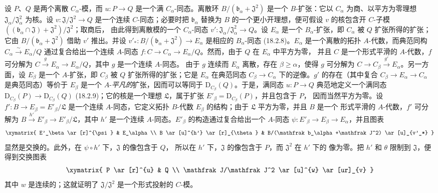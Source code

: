 \begin{env}[19.5.6.1]
\label{0.19.5.6.1-fr}
设 $P$、$Q$ 是两个离散 $C_\alpha$-模，而
$u:P\to Q$ 是一个满 $C_\alpha$-同态。离散环
$B/(\mathfrak b_\alpha+\mathfrak J^2)$ 是一个 $B$-扩张：它以
$C_\alpha$ 为商、以平方为零理想
$\mathfrak J_\alpha/\mathfrak J_\alpha^2$ 为核。设
$v:\mathfrak J/\mathfrak J^2\to Q$ 是一个连续 $C$-同态；必要时把
$\mathfrak b_\alpha$ 替换为 $B$ 的一个更小开理想，便可假设 $v$ 的核包含开
$C$-子模
$((\mathfrak b_\alpha\cap\mathfrak J)+\mathfrak J^2)/\mathfrak J^2$；取商后，
由此得到离散模的一个 $C_\alpha$-同态
$v':\mathfrak J_\alpha/\mathfrak J_\alpha^2\to Q$。设 $E_\alpha$ 是一个
$B_\alpha$-扩张，即 $C_\alpha$ 被 $Q$ 扩张所得的扩张；它由
$B/(\mathfrak b_\alpha+\mathfrak J^2)$ 借助 $v'$ 推出。并设
$v'_*:B/(\mathfrak b_\alpha+\mathfrak J^2)\to E_\alpha$ 是相应的
$B_\alpha$-同态 (18.2.8)。$E_\alpha$ 是一个离散的拓扑 $A$-代数，而典范同构
$C_\alpha\xrightarrow{\sim}E_\alpha/Q$ 通过复合给出一个连续 $A$-同态
$f:C\to C_\alpha\to E_\alpha/Q$。然而，由于 $Q$ 在 $E_\alpha$ 中平方为零，
并且 $C$ 是一个形式平滑的 $A$-代数，$f$ 可分解为
$C\xrightarrow{g}E_\alpha\to E_\alpha/Q$，其中 $g$ 是一个连续 $A$-同态。
由于 $g$ 连续而 $E_\alpha$ 离散，存在 $\beta\geq\alpha$，使得 $g$ 可分解为
$C\to C_\beta\xrightarrow{g'}E_\alpha$。另一方面，设 $E_\beta$ 是一个
$A$-扩张，即 $C_\beta$ 被 $Q$ 扩张所得的扩张；它是 $E_\alpha$ 在典范同态
$C_\beta\to C_\alpha$ 下的逆像。$g'$ 的存在（其中复合
$C_\beta\to E_\alpha\to C_\alpha$ 是典范同态）等价于 $E_\beta$ 是一个
$A$-\emph{平凡的}扩张，因而可以等同于 $\mathrm D_{C_\beta}(Q)$。于是，满同态
$u:P\to Q$ 典范地定义一个满同态
$\mathrm D_{C_\beta}(P)\to\mathrm D_{C_\beta}(Q)$ (18.2.9)；它的核是一个理想
$\mathfrak L$，属于扩张 $E'_\beta=\mathrm D_{C_\beta}(P)$，并且包含于 $P$，
因而当然平方为零。设
$f':B\to E_\beta=E'_\beta/\mathfrak L$ 是一个连续 $A$-同态，它定义拓扑
$B$-代数 $E_\beta$ 的结构；由于 $\mathfrak L$ 平方为零，并且 $B$ 是一个
形式平滑的 $A$-代数，$f'$ 可分解为
$B\xrightarrow{h'}E'_\beta\to E'_\beta/\mathfrak L$，其中 $h'$ 是一个连续
$A$-同态。$E'_\beta$ 的构造通过复合给出一个 $A$-同态
$\psi:E'_\beta\to E_\beta\to E_\alpha$，并且图表
\[
  \xymatrix{
    E'_\beta \ar[r]^{\psi} & E_\alpha \\
    B \ar[u]^{h'} \ar[r]_{\theta} &
    B/(\mathfrak b_\alpha+\mathfrak J^2) \ar[u]_{v'_*}
  }
\]
显然是交换的。此外，在 $\psi\circ h'$ 下，$\mathfrak J$ 的像包含于 $Q$，
所以在 $h'$ 下，$\mathfrak J$ 的像包含于 $P$，而 $\mathfrak J^2$ 在 $h'$ 下的
像为零。把 $h'$ 和 $\theta$ 限制到 $\mathfrak J$，便得到交换图表
\[
  \xymatrix{
    P \ar[r]^{u} & Q \\
    \mathfrak J/\mathfrak J^2 \ar[u]^{w} \ar[ur]_{v}
  }
\]
其中 $w$ 是连续的；这就证明了 $\mathfrak J/\mathfrak J^2$ 是一个形式投射的
$C$-模。
\end{env}

